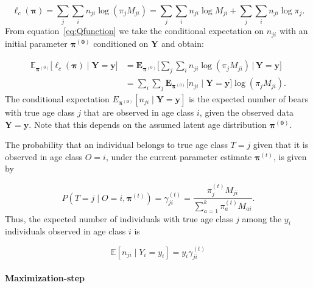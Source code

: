 \documentclass[11pt,a4paper]{article}
\begin{document}
\begin{equation}
	\ell_c(\boldsymbol{\pi}) =  \sum_{j} \sum_{i} n_{ji} \log (\pi_j M_{ji}) = \sum_{j} \sum_{i} n_{ji} \log  M_{ji} + \sum_{j} \sum_{i} n_{ji} \log \pi_j.
	\label{eq:decomp_likelihood}
\end{equation}
From equation~\eqref{eq:Qfunction} we take the conditional expectation on $n_{ji}$ with an initial parameter $\boldsymbol{\pi^{(0)}}$ conditioned on $\boldsymbol{Y}$ and obtain:


\begin{align*}
	\mathbb{E}_{\boldsymbol{\pi}^{(0)}} \big[ \ell_c(\boldsymbol{\pi}) \mid \mathbf{Y} = \mathbf{y} \big]
	&=
	\mathbf{E}_{\boldsymbol{\pi}^{(0)}} \Big[ \sum_{j} \sum_{i} n_{ji} \log (\pi_j M_{ji}) \,\Big|\, \mathbf{Y} = \mathbf{y} \Big] \\
	&=
	\sum_{i} \sum_{j} \mathbf{E}_{\boldsymbol{\pi}^{(0)}} \big[n_{ji} \mid \mathbf{Y} = \mathbf{y}\big] \log (\pi_j M_{ji}).
\end{align*}
The conditional expectation $E_{\boldsymbol{\pi^{(0)}}}[n_{ji} \mid \mathbf{Y} = \mathbf{y}]$ is the expected number of bears with true age class $j$ that are observed in age class $i$, given the observed data $\mathbf{Y} = \mathbf{y}$. Note that this depends on the assumed latent age distribution $\boldsymbol{\pi^{(0)}}$.

The probability that an individual belongs to true age class $T=j$ given that it is observed in age class $O=i$, under the current parameter estimate $\boldsymbol{\pi}^{(t)}$, is given by

\begin{equation}
P(T=j \mid O=i, \boldsymbol{\pi}^{(t)})
= \gamma_{ji}^{(t)} =
\frac{
	\pi_j^{(t)} M_{ji}
}{
	\sum_{a=1}^{k} \pi_a^{(t)} M_{ai}
}.
\end{equation}
Thus, the expected number of individuals with true age class $j$ among the $y_i$ individuals observed in age class $i$ is

\begin{equation}
	\mathbb{E}[n_{ji} \mid Y_i = y_i]
	=
	y_i \gamma_{ji}^{(t)}
	\label{eq:expected_nr_of_indi}
\end{equation}


\paragraph{Maximization-step}
\end{document}

